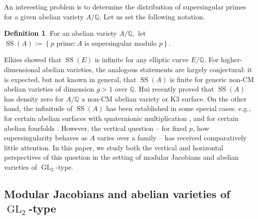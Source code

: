 \documentclass[11pt,letterpaper,reqno]{amsart}
\theoremstyle{definition}
\newtheorem{definition}[theorem]{Definition}
\numberwithin{equation}{section}
\numberwithin{figure}{section}
\numberwithin{table}{section}
\let\subsectiontemp\subsection
\renewcommand{\subsection}[1]{ 
    \subsectiontemp{#1} \hfill\vspace{0.5\linespacing} 
}
\begin{document}
An interesting problem is to determine the distribution of supersingular primes for a given abelian variety $A/\mathbb{Q}$. Let us set the following notation.
\begin{definition}
    For an abelian variety $A/\mathbb{Q},$ let
    $\operatorname{SS}(A) := \left\{ \text{$p$ prime} : \text{$A$ is supersingular modulo $p$}  \right\}\!.$
\end{definition}
Elkies \cite{elkies-1987} showed that $\operatorname{SS}(E)$ is infinite for any elliptic curve $E/\mathbb{Q}.$ For higher-dimensional abelian varieties, the analogous statements are largely conjectural: it is expected, but not known in general, that $ \operatorname{SS}(A)$ is finite for generic non-CM abelian varieties of dimension $g > 1$ over $\mathbb{Q}.$ Hui \cite{HuiSS2025} recently proved that $\operatorname{SS}(A)$ has density zero for $A/\mathbb{Q}$ a non-CM abelian variety or K3 surface. On the other hand, the infinitude of $\operatorname{SS}(A)$ has been established in some special cases: e.g.,  for certain abelian surfaces with quaternionic multiplication \cite{baba-2006}, and for certain abelian fourfolds \cite{4folds2025}. However, the vertical question -- for fixed $p$, how supersingularity behaves as $A$ varies over a family -- has received comparatively little attention. In this paper, we study both the vertical and horizontal perspectives of this question in the setting of modular Jacobians and abelian varieties of $\operatorname{GL}_2$-type.

\subsection{Modular Jacobians and abelian varieties of \texorpdfstring{$\operatorname{GL}_2$}{GL2}-type} \label{subsection:modular-jacobians}
\end{document}
